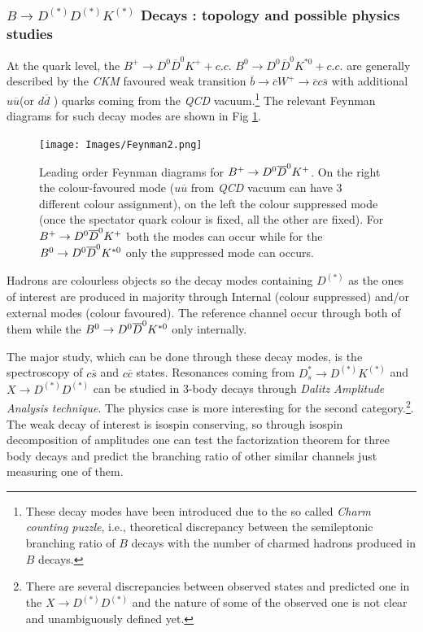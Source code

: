 \documentclass[paper=a4, fontsize=10pt]{scrartcl}
\numberwithin{equation}{section}		%
\numberwithin{figure}{section}			%
\numberwithin{table}{section}				%
\begin{document}
\subsubsection{${ B }\rightarrow { D }^{ (*)} { D }^{ (*) } { K }^{ (*) }$ Decays : topology and possible physics studies}

At the quark level, the  $B^{+}\rightarrow D^{0} \overline{D}^{0} K^{+} +c.c.$ 
$B^{0}\rightarrow D^{0} \overline{D}^{0} K^{\ast 0}  +  c.c.$ are generally described by the \textit{CKM} favoured weak transition $\overline{b} \rightarrow \overline{c} W^{+} \rightarrow \overline{c} c \overline{s}$ with additional $u\overline{u}$(or $d\overline{d} $ ) quarks coming from the \textit{QCD} vacuum.\footnote{These decay modes have been introduced due to the so called \textit{Charm counting puzzle}, i.e., theoretical discrepancy between the semileptonic branching ratio of $B$ decays with the number of charmed hadrons produced in $B$  decays.}  The relevant Feynman diagrams for such decay modes are shown in Fig \ref{quarks}.
\begin{figure}[h!]
\begin{center}
\texttt{[image: Images/Feynman2.png]}
\caption{Leading order Feynman diagrams for $B^{+} \rightarrow D^0 \overline{D}^{0} K^{+}$. On the right the colour-favoured mode ($u\overline{u}$ from \textit{QCD} vacuum can have 3 different colour assignment), on the left the colour suppressed mode (once the spectator quark colour is fixed, all the other are fixed). For $B^{+} \rightarrow D^0 \overline{D}^{0} K^{+}$ both the modes can occur while for the $B^{0} \rightarrow D^0 \overline{D}^{0} K^{\ast 0}$ only the suppressed mode can occurs.}\label{quarks}
\end{center}
\end{figure}


Hadrons are colourless objects so the decay modes containing $D^{(\ast)}$ as the ones of interest are produced in majority through Internal (colour suppressed) and/or external modes (colour favoured). The reference channel occur through both of them while the $B^{0} \rightarrow D^0 \overline{D}^{0} K^{\ast 0}$ only internally.

The major study, which can be done through these decay modes, is the spectroscopy of $c\overline{s} $ and $c\overline{c}$ states. Resonances coming from  $D^{\ast}_{s} \rightarrow D^{(\ast)} K^{(\ast)}$ and  $X \rightarrow D^{(\ast)}D^{(\ast)}$ can be studied in 3-body decays through \textit{Dalitz Amplitude Analysis technique}. The physics case is more interesting for the second category.\footnote{ There are several discrepancies between observed states and predicted one in the $X \rightarrow D^{(\ast)}D^{(\ast)}$ and the nature of some of the observed one is not clear and unambiguously defined yet.}.
The weak decay of interest is isospin conserving, so through isospin decomposition of amplitudes one can test the factorization theorem for three body decays and predict the branching ratio of other similar channels just measuring one of them.
\end{document}

